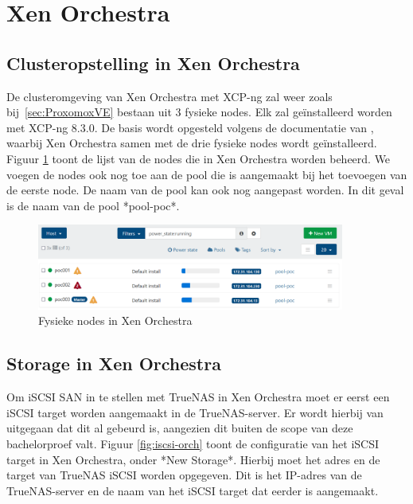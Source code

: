 \section{Xen Orchestra}%
\subsection{Clusteropstelling in Xen Orchestra}
De clusteromgeving van Xen Orchestra met XCP-ng zal weer zoals bij~\ref{sec:ProxomoxVE} bestaan uit 3 fysieke nodes. Elk zal geïnstalleerd worden met XCP-ng 8.3.0.  
De basis wordt opgesteld volgens de documentatie van \textcite{dick2023xcpng}, waarbij Xen Orchestra samen met de drie fysieke nodes wordt geïnstalleerd.  
Figuur \ref{fig:nodes-list} toont de lijst van de nodes die in Xen Orchestra worden beheerd.  
We voegen de nodes ook nog toe aan de pool die is aangemaakt bij het toevoegen van de eerste node. De naam van de pool kan ook nog aangepast worden. In dit geval is de naam van de pool *pool-poc*.

\begin{figure}[H]
  \centering
  \includegraphics[width=0.9\textwidth]{../poc/nodes-orch.png}
  \caption{Fysieke nodes in Xen Orchestra}
  \label{fig:nodes-list}
\end{figure}

\subsection{Storage in Xen Orchestra}%
\label{sec:storage_orch}
Om iSCSI SAN in te stellen met TrueNAS in Xen Orchestra moet er eerst een iSCSI target worden aangemaakt in de TrueNAS-server. Er wordt hierbij van uitgegaan dat dit al gebeurd is, aangezien dit buiten de scope van deze bachelorproef valt.
Figuur \ref{fig:iscsi-orch} toont de configuratie van het iSCSI target in Xen Orchestra, onder *New Storage*. Hierbij moet het adres en de target van TrueNAS iSCSI worden opgegeven. Dit is het IP-adres van de TrueNAS-server en de naam van het iSCSI target dat eerder is aangemaakt.

